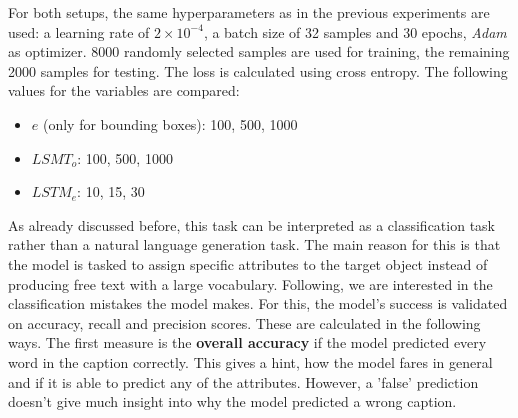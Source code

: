 For both setups, the same hyperparameters as in the previous experiments are used: a learning rate of $2\times10^{-4}$, a batch size of 32 samples and 30 epochs, \emph{Adam} \citep{Kingma2015} as optimizer.
8000 randomly selected samples are used for training, the remaining 2000 samples for testing.
The loss is calculated using cross entropy.
The following values for the variables are compared:
\begin{itemize}
    \item $e$ (only for bounding boxes): 100, 500, 1000
    \item $LSMT_o$: 100, 500, 1000
    \item $LSTM_e$: 10, 15, 30
\end{itemize}

As already discussed before, this task can be interpreted as a classification task rather than a natural language generation task.
The main reason for this is that the model is tasked to assign specific attributes to the target object instead of producing free text with a large vocabulary.
Following, we are interested in the classification mistakes the model makes.
For this, the model's success is validated on accuracy, recall and precision scores.
These are calculated in the following ways.
The first measure is the \textbf{overall accuracy} if the model predicted every word in the caption correctly.
This gives a hint, how the model fares in general and if it is able to predict any of the attributes.
However, a 'false' prediction doesn't give much insight into why the model predicted a wrong caption.

